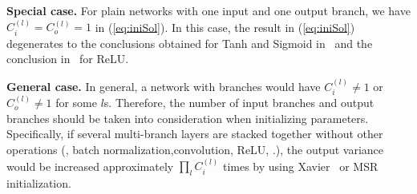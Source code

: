 \documentclass[10pt,twocolumn,letterpaper]{article}
\newcommand{\smalltitle}[1]{\vspace{0.2em}\noindent \textbf{{#1}}}
\begin{document}
\smalltitle{Special case.} For plain networks with one input and one output branch, we have $C^{(l)}_i=C^{(l)}_o=1$ in (\ref{eq:iniSol}). In this case, the result in (\ref{eq:iniSol}) degenerates to the conclusions obtained for Tanh and Sigmoid in~\cite{glorot2010understanding}  and the conclusion in~\cite{he2015delving} for ReLU.

\smalltitle{General case.} In general, a network with branches would have $C^{(l)}_i\neq 1$ or $C^{(l)}_o\neq 1$ for some $l$s. Therefore, the number of input branches and output branches should be taken into consideration when initializing parameters. 
Specifically, if several multi-branch layers are stacked together without other operations (\eg, batch normalization,convolution, ReLU, \etc.), the output variance would be increased approximately $\prod_{l} C^{(l)}_i$ times by using Xavier~\cite{glorot2010understanding} or MSR~\cite{he2015delving} initialization. 
\end{document}
